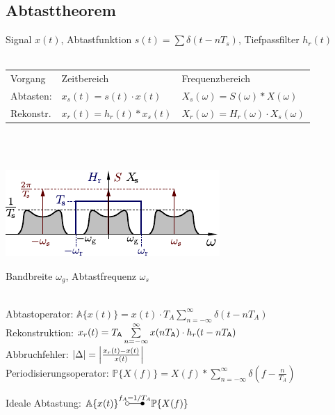 \documentclass[fs, footer]{latex4ei}
\begin{document}
\begin{multicols*}{4}
{\subsection*{Abtasttheorem}
Signal $x(t)$, Abtastfunktion $s(t) = \sum \delta(t-nT_s)$, Tiefpassfilter $h_r(t)$\\
\\
\begin{tabular*}{\columnwidth}{@{\extracolsep\fill}lll@{}}
	Vorgang & Zeitbereich & Frequenzbereich\\
	Abtasten: & $x_s(t) = s(t) \cdot x(t)$ & $X_s(\omega) = S(\omega) * X(\omega)$\\
	Rekonstr. & $x_r(t) = h_r(t) * x_s(t)$ & $X_r(\omega) = H_r(\omega) \cdot X_s(\omega)$\\
\end{tabular*}\\
\\
\begin{center} \includegraphics[scale = 1]{./img/sampletheorem.pdf} \end{center}

Bandbreite $\omega_g$, Abtastfrequenz $\omega_s$\\
\\
 \qquad {}

Abtastoperator: $\mathbb A\{x(t)\} = x(t) \cdot T_A \sum \limits_{n = - \infty}^{\infty} \delta (t - n T_A)$ \\
Rekonstruktion: $x_r(t) = T_{\sf A} \sum \limits_{n = - \infty}^{\infty} x(n T_{\sf A}) \cdot h_r(t - nT_{\sf A})$\\
Abbruchfehler: $\left\vert\Delta\right\vert = \left\vert\frac{x_r(t) - x(t)}{x(t)}\right\vert$\\
Periodisierungsoperator: $\mathbb P \{ X(f) \} = X(f) * \sum \limits_{n = - \infty}^\infty \delta (f - \frac{n}{T_A})$

Ideale Abtastung:
$\mathbb A \{x(t) \} \overset{f_A = 1 / T_A}{\ftsymbol} \mathbb P \{ X(f) \}$
}




\end{multicols*}
\end{document}
